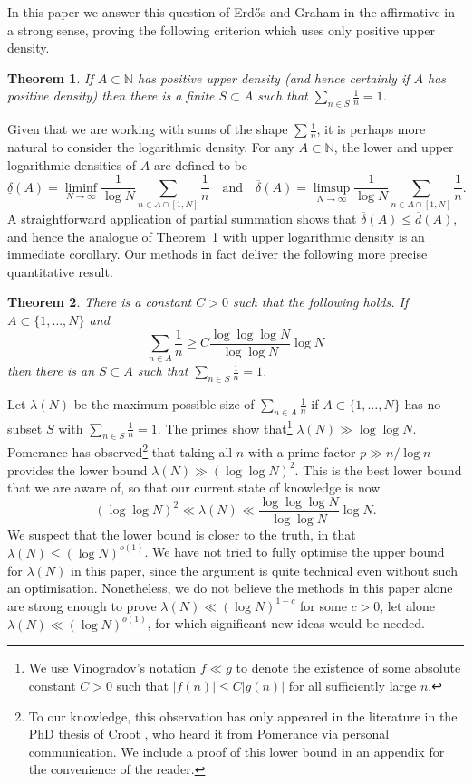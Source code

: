 \documentclass{amsart}
\newcommand{\bbn}{\mathbb{N}}
\newcommand{\abs}[1]{\left\lvert #1\right\rvert}
\newtheorem{theorem}{Theorem}
\begin{document}
In this paper we answer this question of Erd\H{o}s and Graham in the affirmative in a strong sense, proving the following criterion which uses only positive upper density.
\begin{theorem}\label{th-dens}
If $A\subset \bbn$ has positive upper density (and hence certainly if $A$ has positive density) then there is a finite $S\subset A$ such that $\sum_{n\in S}\frac{1}{n}=1$.
\end{theorem}

Given that we are working with sums of the shape $\sum\frac{1}{n}$, it is perhaps more natural to consider the logarithmic density. For any $A\subset \bbn$, the lower and upper logarithmic densities of $A$ are defined to be
\[\underline{\delta}(A) = \liminf_{N\to\infty}\frac{1}{\log N}\sum_{n\in A\cap [1,N]}\frac{1}{n}\quad\textrm{and}\quad\overline{\delta}(A) = \limsup_{N\to\infty}\frac{1}{\log N}\sum_{n\in A\cap [1,N]}\frac{1}{n}.\]
A straightforward application of partial summation shows that $\overline{\delta}(A)\leq \overline{d}(A)$, and hence the analogue of Theorem~\ref{th-dens} with upper logarithmic density is an immediate corollary. Our methods in fact deliver the following more precise quantitative result.
\begin{theorem}\label{th-quant}
There is a constant $C>0$ such that the following holds. If $A\subset \{1,\ldots,N\}$ and 
\[\sum_{n\in A}\frac{1}{n}\geq C \frac{\log \log\log N}{\log\log N}\log N\]
then there is an $S\subset A$ such that $\sum_{n\in S}\frac{1}{n}=1$.
\end{theorem}
Let $\lambda(N)$ be the maximum possible size of $\sum_{n\in A}\frac{1}{n}$ if $A\subset \{1,\ldots,N\}$ has no subset $S$ with $\sum_{n\in S}\frac{1}{n}=1$. The primes show that\footnote{We use Vinogradov's notation $f\ll g$ to denote the existence of some absolute constant $C>0$ such that $\abs{f(n)}\leq C\abs{g(n)}$ for all sufficiently large $n$.} $\lambda(N) \gg \log\log N$. Pomerance has observed\footnote{To our knowledge, this observation has only appeared in the literature in the PhD thesis of Croot \cite{Crootphd}, who heard it from Pomerance via personal communication. We include a proof of this lower bound in an appendix  for the convenience of the reader.}  that taking all $n$ with a prime factor $p\gg n/\log n$ provides the lower bound $\lambda(N) \gg (\log\log N)^2$. This is the best lower bound that we are aware of, so that our current state of knowledge is now
\[(\log\log N)^2 \ll \lambda(N) \ll \frac{\log \log\log N}{\log\log N}\log N.\]
 We suspect that the lower bound is closer to the truth, in that $\lambda(N)\leq (\log N)^{o(1)}$. We have not tried to fully optimise the upper bound for $\lambda(N)$ in this paper, since the argument is quite technical even without such an optimisation. Nonetheless, we do not believe the methods in this paper alone are strong enough to prove $\lambda(N) \ll (\log N)^{1-c}$ for some $c>0$, let alone $\lambda(N)\ll (\log N)^{o(1)}$, for which significant new ideas would be needed.
\end{document}
